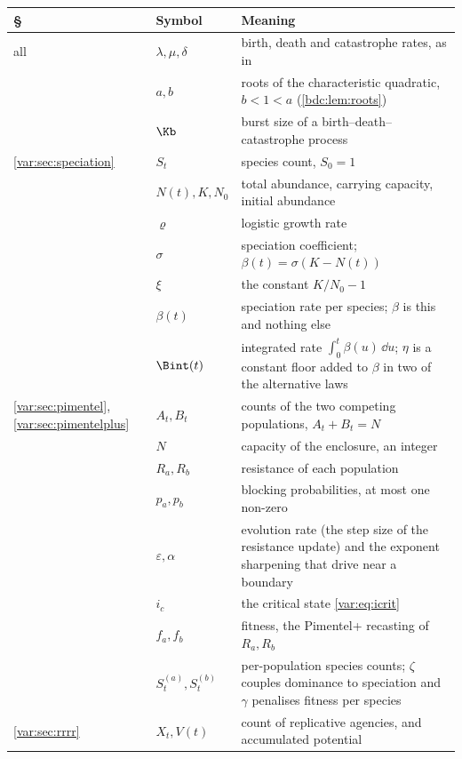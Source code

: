 \begin{table}[H]
\centering
\footnotesize
\setlength{\tabcolsep}{4pt}
\begin{tabular}{@{}ll>{\raggedright\arraybackslash}p{}@{}}
\toprule
\S & Symbol & Meaning \\
\midrule
all & $\lambda,\mu,\delta$ & birth, death and catastrophe rates, as in
  \ChCore{} \\
& $a,b$ & roots of the characteristic quadratic, $b<1<a$
  (\cref{bdc:lem:roots}) \\
& $\Kb$ & burst size of a birth--death--catastrophe process \\
\midrule
\ref{var:sec:speciation}
 & $S_t$ & species count, $S_0=1$ \\
 & $N(t),K,N_0$ & total abundance, carrying capacity, initial abundance \\
 & $\varrho$ & logistic growth rate \\
 & $\sigma$ & speciation coefficient; $\beta(t)=\sigma(K-N(t))$ \\
 & $\xi$ & the constant $K/N_0-1$ \\
 & $\beta(t)$ & speciation rate per species; $\beta$ is this and nothing else \\
 & $\Bint(t)$ & integrated rate $\int_0^t\beta(u)\,\dd u$; $\eta$ is a constant floor added to $\beta$ in two of the alternative laws \\
\midrule
\ref{var:sec:pimentel},
\ref{var:sec:pimentelplus}
 & $A_t,B_t$ & counts of the two competing populations, $A_t+B_t=N$ \\
 & $N$ & capacity of the enclosure, an integer \\
 & $R_a,R_b$ & resistance of each population \\
 & $p_a,p_b$ & blocking probabilities, at most one non-zero \\
 & $\varepsilon,\alpha$ & evolution rate (the step size of the resistance update) and the exponent sharpening that drive near a boundary \\
 & $i_c$ & the critical state \cref{var:eq:icrit} \\
 & $f_a,f_b$ & fitness, the Pimentel+ recasting of $R_a,R_b$ \\
 & $S^{(a)}_t,S^{(b)}_t$ & per-population species counts; $\zeta$ couples dominance to speciation and $\gamma$ penalises fitness per species \\
\midrule
\ref{var:sec:rrrr}
 & $X_t,V(t)$ & count of replicative agencies, and accumulated potential \\

\end{tabular}
\end{table}
